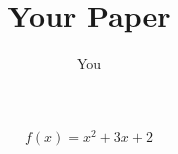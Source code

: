 \documentclass{article}
\title{Your Paper}
\author{You}
\begin{document}
\[f(x) = x^2 + 3x + 2\]
\end{document}
